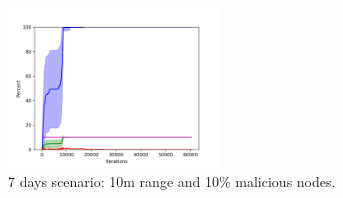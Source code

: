 \begin{figure}
\centering
\includegraphics[width=0.5\textwidth]{images/plots/Network_rA7/10_10}
\caption{7 days scenario: 10m range and 10\% malicious nodes.} \label{fig:random7}
\end{figure}

%
%
%
%
%
%
%
%
%
%
%
%

